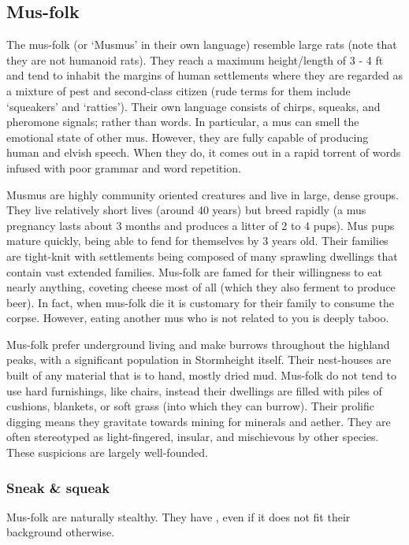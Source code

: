 \documentclass[a4paper,11pt,oneside]{book}
\newcommand{\textlf}[1]{\textbf{\titlecap{#1}}}
\begin{document}
\subsection{Mus-folk}
The mus-folk (or `Musmus' in their own language) resemble large rats (note that they are not humanoid rats). They reach a maximum height/length of 3 - 4 ft and tend to inhabit the margins of human settlements where they are regarded as a mixture of pest and second-class citizen (rude terms for them include `squeakers' and `ratties'). Their own language consists of chirps, squeaks, and pheromone signals; rather than words. In particular, a mus can smell the emotional state of other mus. However, they are fully capable of producing human and elvish speech. When they do, it comes out in a rapid torrent of words infused with poor grammar and word repetition. 

Musmus are highly community oriented creatures and live in large, dense groups. They live relatively short lives (around 40 years) but breed rapidly (a mus pregnancy lasts about 3 months and produces a litter of 2 to 4 pups). Mus pups mature quickly, being able to fend for themselves by 3 years old. Their families are tight-knit with settlements being composed of many sprawling dwellings that contain vast extended families. Mus-folk are famed for their willingness to eat nearly anything, coveting cheese most of all (which they also ferment to produce beer). In fact, when mus-folk die it is customary for their family to consume the corpse. However, eating another mus who is not related to you is deeply taboo.

Mus-folk prefer underground living and make burrows throughout the highland peaks, with a significant population in Stormheight itself. Their nest-houses are built of any material that is to hand, mostly dried mud. Mus-folk do not tend to use hard furnishings, like chairs, instead their dwellings are filled with piles of cushions, blankets, or soft grass (into which they can burrow). Their prolific digging means they gravitate towards mining for minerals and aether. They are often stereotyped as light-fingered, insular, and mischievous by other species. These suspicions are largely well-founded.

\subsubsection*{Sneak \& squeak}
Mus-folk are naturally stealthy. They have \textlf{stealth proficiency}, even if it does not fit their background otherwise. 
\end{document}
